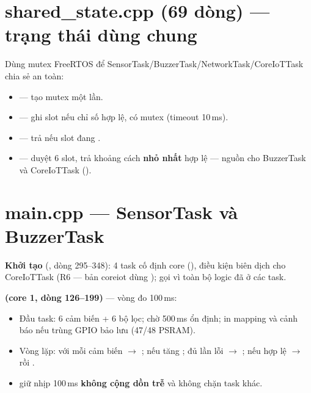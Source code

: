 \section{shared\_state.cpp (69 dòng) — trạng thái dùng chung}

Dùng mutex FreeRTOS để SensorTask/BuzzerTask/NetworkTask/CoreIoTTask chia sẻ
an toàn:
\begin{itemize}
\item {} — tạo mutex một lần.
\item {} — ghi slot nếu chỉ số hợp lệ, có
mutex (timeout 10\,ms).
\item {} — trả  nếu slot đang .
\item {} — duyệt 6 slot, trả khoảng cách \textbf{nhỏ
nhất} hợp lệ — nguồn cho BuzzerTask và CoreIoTTask ().
\end{itemize}

\section{main.cpp — SensorTask và BuzzerTask}

\textbf{Khởi tạo} (, dòng 295--348): 4 task cố định core
(), điều kiện biên dịch 
cho CoreIoTTask (R6 — bản coreiot dùng );
 gọi  vì toàn bộ logic đã ở các task.

\textbf{ (core 1, dòng 126--199)} — vòng đo 100\,ms:
\begin{itemize}
\item Đầu task:  6 cảm biến +  6 bộ lọc; chờ 500\,ms
ổn định; in mapping  và cảnh báo
 nếu trùng GPIO bảo lưu (47/48 PSRAM).
\item Vòng lặp: với mỗi cảm biến $\rightarrow$ ; nếu
 tăng ; đủ
 lần lỗi $\rightarrow$
; nếu hợp lệ
$\rightarrow$  rồi .
\item {} giữ nhịp 100\,ms \textbf{không cộng dồn trễ} và
không chặn task khác.
\end{itemize}

